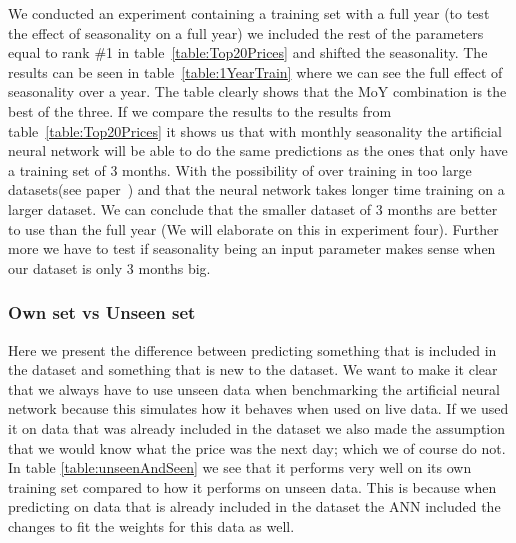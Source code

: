 We conducted an experiment containing a training set with a full year (to test the effect of seasonality on a full year) we included the rest of the parameters equal to rank \#1 in table~\ref{table:Top20Prices} and shifted the seasonality. The results can be seen in table~\ref{table:1YearTrain} where we can see the full effect of seasonality over a year. The table clearly shows that the MoY combination is the best of the three. If we compare the results to the results from table~\ref{table:Top20Prices} it shows us that with monthly seasonality the artificial neural network will be able to do the same predictions as the ones that only have a training set of 3 months. With the possibility of over training in too large datasets(see paper~\cite{1}) and that the neural network takes longer time training on a larger dataset. We can conclude that the smaller dataset of 3 months are better to use than the full year (We will elaborate on this in experiment four). Further more we have to test if seasonality being an input parameter makes sense when our dataset is only 3 months big.

\subsubsection{Own set vs Unseen set}
Here we present the difference between predicting something that is included in the dataset and something that is new to the dataset. We want to make it clear that we always have to use unseen data when benchmarking the artificial neural network because this simulates how it behaves when used on live data. If we used it on data that was already included in the dataset we also made the assumption that we would know what the price was the next day; which we of course do not. In table \ref{table:unseenAndSeen} we see that it performs very well on its own training set compared to how it performs on unseen data. This is because when predicting on data that is already included in the dataset the ANN included the changes to fit the weights for this data as well.

